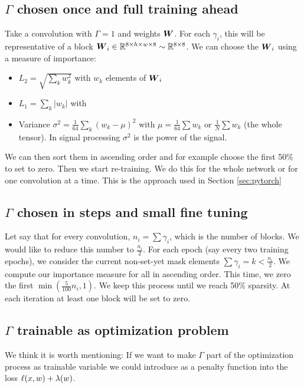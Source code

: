 \documentclass[conference]{IEEEtran}
\begin{document}
\subsection{$\Gamma$ chosen once and full training ahead}
\label{sec:one-mask}
Take a convolution with $\Gamma = 1$ and weights ${\boldsymbol W}$. For each
$\gamma_i$, this will be representative of a block ${\boldsymbol W}_i \in \mathbb{R}^{8
  \times h \times w \times 8} \sim \mathbb{R}^{8\times 8}$. We can choose the
${\boldsymbol W}_i$ using a measure of importance:
\begin{itemize}
  \item $L_2 = \sqrt{\sum_k w_k^2}$ with $w_k$ elements of ${\boldsymbol W}_i$
  \item $L_1 = \sum_k |w_k|$ with 
  \item Variance $\sigma^2 = \frac{1}{64}\sum_k (w_k -\mu)^2$ with
    $\mu = \frac{1}{64}\sum w_k $ or $\frac{1}{N}\sum w_k$ (the whole
    tensor). In signal processing $\sigma^2$ is the power of the
    signal.
\end{itemize}
We can then sort them in ascending order and for example choose the
first 50\% to set to zero. Then we start re-training. We do this for the
whole network or for one convolution at a time. This is the approach
used in Section \ref{sec:pytorch}

\subsection{$\Gamma$ chosen in steps  and small fine tuning}

Let say that for every convolution, $n_i =\sum \gamma_i$, which is the
number of blocks. We would like to reduce this number to
$\frac{n_i}{2}$. For each epoch (say every two training epochs), we
consider the current non-set-yet mask elements $\sum \gamma_i = k <
\frac{n_i}{2}$. We compute our importance measure for all in ascending
order. This time, we zero the first $\min(\frac{5}{100}n_i, 1)$. We
keep this process until we reach 50\% sparsity. At each iteration at
least one block will be set to zero.

\subsection{$\Gamma$ trainable as optimization problem}

We think it is worth mentioning: If we want to make $\Gamma$ part of
the optimization process as trainable variable we could introduce as a
penalty function into the loss ${\bf \ell}(x,w) + \lambda(w)$.
\end{document}
